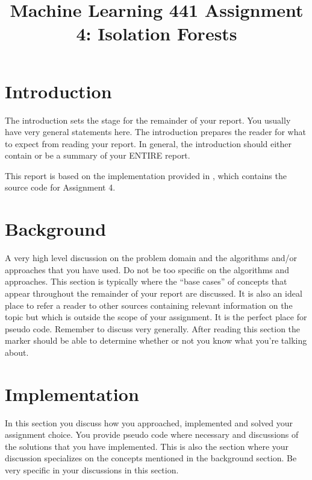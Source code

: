 \documentclass[conference]{IEEEtran}
\begin{document}
	
	\title{Machine Learning 441 Assignment 4: Isolation Forests}
	\author{
	}
	\maketitle
	
	\begin{abstract}
	\end{abstract}
	
	\section{Introduction}
	The introduction sets the stage for the remainder of your report. You usually have very general statements here.
	The introduction prepares the reader for what to expect from reading your report. In general, the introduction
	should either contain or be a summary of your ENTIRE report.
	
	This report is based on the implementation provided in \cite{github}, which contains the source code for Assignment 4.
	
	\section{Background}\label{B}
	A very high level discussion on the problem domain and the algorithms and/or approaches that you have used.
	Do not be too specific on the algorithms and approaches. This section is typically where the “base cases” of
	concepts that appear throughout the remainder of your report are discussed. It is also an ideal place to refer
	a reader to other sources containing relevant information on the topic but which is outside the scope of your
	assignment. It is the perfect place for pseudo code. Remember to discuss very generally. After reading this
	section the marker should be able to determine whether or not you know what you’re talking about.
	
	\section{Implementation}\label{I}
	In this section you discuss how you approached, implemented and solved your assignment choice. You provide
	pseudo code where necessary and discussions of the solutions that you have implemented. This is also the
	section where your discussion specializes on the concepts mentioned in the background section. Be very specific
	in your discussions in this section.
	
\end{document}
